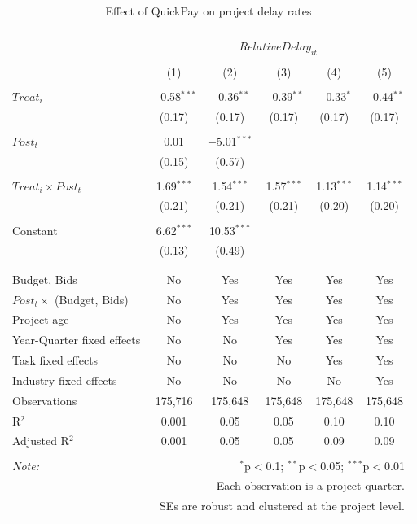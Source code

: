 \documentclass[
]{article}
\begin{document}
\begin{table}[H] \centering 
  \caption{Effect of QuickPay on project delay rates} 
  \label{} 
\small 
\begin{tabular}{@{\extracolsep{-2pt}}lccccc} 
\\[-1.8ex]\hline 
\hline \\[-1.8ex] 
\\[-1.8ex] & \multicolumn{5}{c}{$RelativeDelay_{it}$} \\ 
\\[-1.8ex] & (1) & (2) & (3) & (4) & (5)\\ 
\hline \\[-1.8ex] 
 $Treat_i$ & $-$0.58$^{***}$ & $-$0.36$^{**}$ & $-$0.39$^{**}$ & $-$0.33$^{*}$ & $-$0.44$^{**}$ \\ 
  & (0.17) & (0.17) & (0.17) & (0.17) & (0.17) \\ 
  & & & & & \\ 
 $Post_t$ & 0.01 & $-$5.01$^{***}$ &  &  &  \\ 
  & (0.15) & (0.57) &  &  &  \\ 
  & & & & & \\ 
 $Treat_i \times Post_t$ & 1.69$^{***}$ & 1.54$^{***}$ & 1.57$^{***}$ & 1.13$^{***}$ & 1.14$^{***}$ \\ 
  & (0.21) & (0.21) & (0.21) & (0.20) & (0.20) \\ 
  & & & & & \\ 
 Constant & 6.62$^{***}$ & 10.53$^{***}$ &  &  &  \\ 
  & (0.13) & (0.49) &  &  &  \\ 
  & & & & & \\ 
\hline \\[-1.8ex] 
Budget, Bids & No & Yes & Yes & Yes & Yes \\ 
$Post_t \times$  (Budget, Bids) & No & Yes & Yes & Yes & Yes \\ 
Project age & No & Yes & Yes & Yes & Yes \\ 
Year-Quarter fixed effects & No & No & Yes & Yes & Yes \\ 
Task fixed effects & No & No & No & Yes & Yes \\ 
Industry fixed effects & No & No & No & No & Yes \\ 
Observations & 175,716 & 175,648 & 175,648 & 175,648 & 175,648 \\ 
R$^{2}$ & 0.001 & 0.05 & 0.05 & 0.10 & 0.10 \\ 
Adjusted R$^{2}$ & 0.001 & 0.05 & 0.05 & 0.09 & 0.09 \\ 
\hline 
\hline \\[-1.8ex] 
\textit{Note:}  & \multicolumn{5}{r}{$^{*}$p$<$0.1; $^{**}$p$<$0.05; $^{***}$p$<$0.01} \\ 
 & \multicolumn{5}{r}{Each observation is a project-quarter.} \\ 
 & \multicolumn{5}{r}{SEs are robust and clustered at the project level.} \\ 
\end{tabular} 
\end{table}
\end{document}
